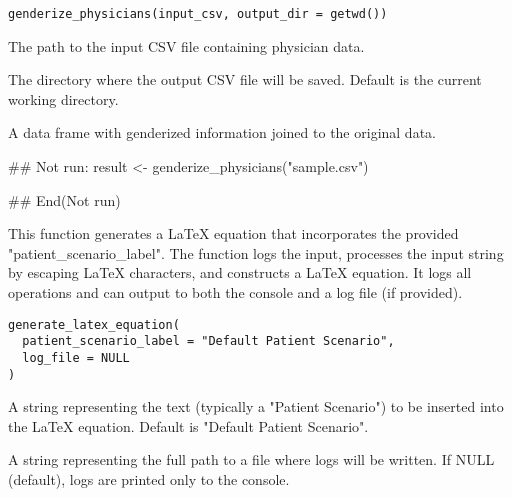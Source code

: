 \documentclass[a4paper]{book}
\begin{document}
%
\begin{Usage}
\begin{verbatim}
genderize_physicians(input_csv, output_dir = getwd())
\end{verbatim}
\end{Usage}
%
\begin{Arguments}
\begin{ldescription}
\item[\code{input\_csv}] The path to the input CSV file containing physician data.

\item[\code{output\_dir}] The directory where the output CSV file will be saved. Default is the current working directory.
\end{ldescription}
\end{Arguments}
%
\begin{Value}
A data frame with genderized information joined to the original data.
\end{Value}
%
\begin{Examples}
\begin{ExampleCode}
## Not run: 
result <- genderize_physicians("sample.csv")

## End(Not run)

\end{ExampleCode}
\end{Examples}
%
\begin{Description}
This function generates a LaTeX equation that incorporates the provided "patient\_scenario\_label".
The function logs the input, processes the input string by escaping LaTeX characters,
and constructs a LaTeX equation. It logs all operations and can output to both the console
and a log file (if provided).
\end{Description}
%
\begin{Usage}
\begin{verbatim}
generate_latex_equation(
  patient_scenario_label = "Default Patient Scenario",
  log_file = NULL
)
\end{verbatim}
\end{Usage}
%
\begin{Arguments}
\begin{ldescription}
\item[\code{patient\_scenario\_label}] A string representing the text (typically a "Patient Scenario")
to be inserted into the LaTeX equation. Default is "Default Patient Scenario".

\item[\code{log\_file}] A string representing the full path to a file where logs will be written.
If NULL (default), logs are printed only to the console.
\end{ldescription}
\end{Arguments}
\end{document}
